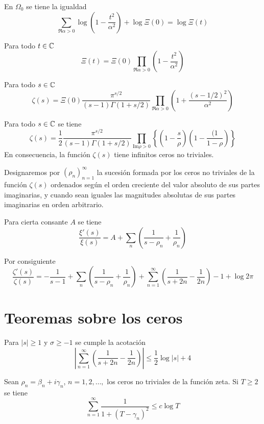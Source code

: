 \documentclass[TAN.tex]{subfiles}
\begin{document}
\begin{teorema}
En $Ω_0$ se tiene la igualdad
\[ \sum_{\Re α > 0} \log\left(1-\frac{t^2}{α^2}\right) + \log Ξ(0) = \log Ξ(t) \]
\end{teorema}

\begin{coro}
Para todo $t \in \mathbb{C}$
\[ Ξ(t) = Ξ(0) \prod_{\Re α > 0} \left(1-\frac{t^2}{α^2}\right) \]
\end{coro}

\begin{teorema}
Para todo $s \in \mathbb{C}$
\[ ζ(s) = Ξ(0)\frac{π^{s/2}}{(s-1)Γ(1+s/2)} \prod_{\Re α > 0} \left(1 + \frac{(s-1/2)^2}{α^2}\right) \]
\end{teorema}

\begin{teorema}
Para todo $s \in \mathbb{C}$ se tiene
\[ ζ(s) = \frac{1}{2}\frac{π^{s/2}}{(s-1)Γ(1+s/2)} \prod_{\text{Im} ρ > 0} \left\{\left(1-\frac{s}{ρ}\right)\left(1 - \frac{(1}{1-ρ}\right)\right\} \]
En consecuencia, la función $ζ(s)$ tiene infinitos ceros no triviales.
\end{teorema}

Designaremos por $(ρ_n)_{n=1}^{∞}$ la sucesión formada por los ceros no triviales de la función $ζ(s)$ ordenados según el orden creciente del valor absoluto de sus partes imaginarias, y cuando sean iguales las magnitudes absolutas de sus partes imaginarias en orden arbitrario.

\begin{coro}
Para cierta consante $A$ se tiene
\[ \frac{ξ'(s)}{ξ(s)} = A + \sum_n \left(\frac{1}{s-ρ_n} + \frac{1}{ρ_n}\right)\]

Por consiguiente
\[ \frac{ζ'(s)}{ζ(s)} = - \frac{1}{s-1} + \sum_n \left(\frac{1}{s-ρ_n} + \frac{1}{ρ_n}\right) + \sum_{n=1}^{∞} \left(\frac{1}{s+2n}-\frac{1}{2n}\right) - 1 + \log 2π\]
\end{coro}

\section{Teoremas sobre los ceros}
\begin{lemma}
Para $|s|≥1$ y $σ ≥ -1$ se cumple la acotación
\[ \left|\sum_{n=1}^{∞} \left(\frac{1}{s+2n}-\frac{1}{2n}\right)\right| ≤ \frac{1}{2} \log |s| + 4 \]
\end{lemma}

\begin{teorema}
Sean $ρ_n = β_n +i γ_n$, $n=1,2,\dots,$ los ceros no triviales de la función zeta. Si $T≥2$ se tiene
\[ \sum_{n=1}^{∞} \frac{1}{1+(T-γ_n)^2} ≤ c \log T \]
\end{teorema}
\end{document}
